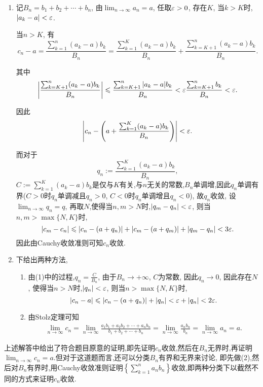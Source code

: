 \begin{solution}
    \begin{enumerate}[(1)]
        \item 记$B_n = b_1+b_2+\cdots+b_n$, 由$\lim_{n\to\infty} a_n = a$, 任取$\varepsilon > 0$, 存在$K$, 当$k > K$时,$|a_k -a| < \varepsilon$.

              当$n > K$, 有
              $$c_n - a = \frac{\sum_{k=1}^{n}(a_k - a)b_k}{B_n}= \frac{\sum_{k=1}^{K}(a_k - a)b_k}{B_n} + \frac{\sum_{k=K+1}^{n}(a_k - a)b_k}{B_n}.$$

              其中$$\left| \frac{\sum_{k=K+1}^{n}(a_k - a)b_k}{B_n}\right| \leqslant \frac{\sum_{k=K+1}^{n}|a_k - a|b_k}{B_n} < \varepsilon \frac{\sum_{k=K+1}^{n}b_k}{B_n} < \varepsilon.$$

              因此$$\left|c_n - \left( a + \frac{\sum_{k=1}^{K}(a_k - a)b_k}{B_n}\right)\right| < \varepsilon.$$

              而对于$$q_n := \frac{\sum_{k=1}^{K}(a_k - a)b_k}{B_n},$$
              $C := \sum_{k=1}^{K}(a_k - a)b_k$是仅与$K$有关,与$n$无关的常数,$B_n$单调增,因此$q_n$单调有界($C>0$时$q_n$单调减且$q_n > 0$, $C<0$时$q_n$单调增且$q_n < 0$), 故$q_n$收敛, 设$\lim_{n\to\infty}q_n = q$, 再取$N$,使得当$n,m > N$时,$|q_m - q_n| < \varepsilon$, 则当$n,m > \max\{N,K\}$时,
              $$|c_m - c_n| \leqslant \left| c_n - \left(a + q_n\right)\right| + \left| c_m - \left(a + q_m\right)\right| + |q_m - q_n| < 3\varepsilon.$$
              因此由Cauchy收敛准则可知$c_n$收敛.
        \item 下给出两种方法,
              \begin{enumerate}
                  \item 由(1)中的过程,$q_n = \frac{C}{B_n}$, 由于$B_n \to +\infty$, $C$为常数, 因此$q_n \to 0$, 因此存在$N$, 使得当$n > N$时,$|q_n| < \varepsilon$, 则当$n > \max\{N,K\}$时,
                        $$|c_n - a| \leqslant \left| c_n - \left(a + q_n\right)\right| + |q_n| < \varepsilon + |q_n| < 2\varepsilon.$$
                  \item 由Stolz定理可知
                        \begin{align*}
                            \lim_{n \to \infty} c_n = \lim_{n \to \infty} \frac{a_1b_1+a_2b_2+\cdots+a_nb_n}{b_1+b_2+\cdots+b_n} = \lim_{n \to \infty} \frac{a_nb_n}{b_n} = \lim_{n \to \infty} a_n = a.
                        \end{align*}
              \end{enumerate}
    \end{enumerate}

    上述解答中给出了符合题目原意的证明,即先证明$c_n$收敛,然后在$B_n$无界时,再证明$\lim_{n \to \infty} c_n = a$.但对于这道题而言,还可以分类$B_n$有界和无界来讨论, 即先做(2),然后对$B_n$有界时,用Cauchy收敛准则证明$\left\{ \sum_{k=1}^{n}a_n b_n \right\}$收敛,即两种分类下以截然不同的方式来证明$c_n$收敛.
\end{solution}

